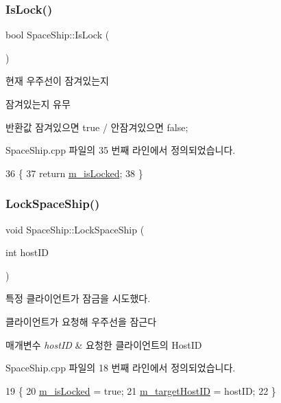 \subsubsection{\texorpdfstring{Is\+Lock()}{IsLock()}}
{\footnotesize\ttfamily bool Space\+Ship\+::\+Is\+Lock (\begin{DoxyParamCaption}{ }\end{DoxyParamCaption})}



현재 우주선이 잠겨있는지 

잠겨있는지 유무

\begin{DoxyReturn}{반환값}
잠겨있으면 true / 안잠겨있으면 false; 
\end{DoxyReturn}


Space\+Ship.\+cpp 파일의 35 번째 라인에서 정의되었습니다.


\begin{DoxyCode}
36 \{ 
37     \textcolor{keywordflow}{return} \hyperlink{class_space_ship_afc1bca7c7439f00cd66b4f415e76f0f6}{m\_isLocked}; 
38 \}
\end{DoxyCode}
\mbox{\label{class_space_ship_ae5fba92c8beecfe121056475096a9331}} 
\subsubsection{\texorpdfstring{Lock\+Space\+Ship()}{LockSpaceShip()}}
{\footnotesize\ttfamily void Space\+Ship\+::\+Lock\+Space\+Ship (\begin{DoxyParamCaption}\item[{int}]{host\+ID }\end{DoxyParamCaption})}



특정 클라이언트가 잠금을 시도했다. 

클라이언트가 요청해 우주선을 잠근다


\begin{DoxyParams}{매개변수}
{\em host\+ID} & 요청한 클라이언트의 Host\+ID \\
\hline
\end{DoxyParams}


Space\+Ship.\+cpp 파일의 18 번째 라인에서 정의되었습니다.


\begin{DoxyCode}
19 \{ 
20     \hyperlink{class_space_ship_afc1bca7c7439f00cd66b4f415e76f0f6}{m\_isLocked} = \textcolor{keyword}{true}; 
21     \hyperlink{class_space_ship_a7b8bd199405824c96906094a2e1312c6}{m\_targetHostID} = hostID; 
22 \}
\end{DoxyCode}
\mbox{\label{class_space_ship_a6447693614706ed1ac5e1a494d87cd12}} 
